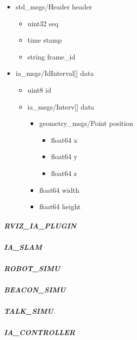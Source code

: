 \begin{itemize}[label={},itemsep=0cm,topsep=0cm]
\item std\_msgs/Header header
  \begin{itemize}[label={},itemsep=0cm,topsep=0cm]
  \item uint32 seq
  \item time stamp
  \item string frame\_id
  \end{itemize}
\item ia\_msgs/IdInterval[] data
  \begin{itemize}[label={},itemsep=0cm,topsep=0cm]
  \item uint8 id
  \item ia\_msgs/Interv[] data
    \begin{itemize}[label={},itemsep=0cm,topsep=0cm]
    \item geometry\_msgs/Point position
      \begin{itemize}[label={},itemsep=0cm,topsep=0cm]
      \item float64 x
      \item float64 y
      \item float64 z
      \end{itemize}
    \item float64 width
    \item float64 height
    \end{itemize}
  \end{itemize}
\end{itemize}
\subparagraph*{RVIZ\_IA\_PLUGIN}
\subparagraph*{IA\_SLAM}
\subparagraph*{ROBOT\_SIMU}
\subparagraph*{BEACON\_SIMU}
\subparagraph*{TALK\_SIMU}
\subparagraph*{IA\_CONTROLLER}


